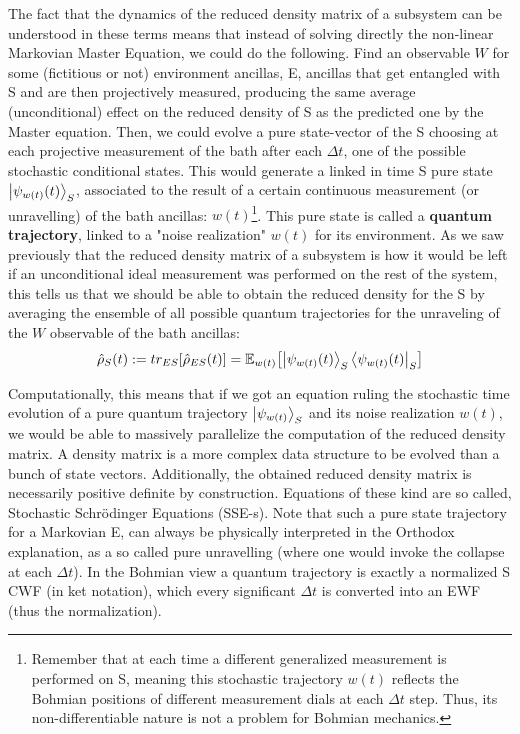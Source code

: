 \documentclass[11pt, a4paper]{article} %
\begin{document}
The fact that the dynamics of the reduced density matrix of a subsystem can be understood in these terms means that instead of solving directly the non-linear Markovian Master Equation, we could do the following. Find an observable $W$ for some (fictitious or not) environment ancillas, E, ancillas that get entangled with S and are then projectively measured, producing the same average (unconditional) effect on the reduced density of S as the predicted one by the Master equation. Then, we could evolve a pure state-vector of the S choosing at each projective measurement of the bath after each $\Delta t$, one of the possible stochastic conditional states. This would generate a linked in time S pure state $\ket{\psi_{w(t)}(t)}_S$, associated to the result of a certain continuous measurement (or unravelling) of the bath ancillas: $w(t)$\footnote{Remember that at each time a different generalized measurement is performed on S, meaning this stochastic trajectory $w(t)$ reflects the Bohmian positions of different measurement dials at each $\Delta t$ step. Thus, its non-differentiable nature is not a problem for Bohmian mechanics.}. This pure state is called a {\bf quantum trajectory}, linked to a "noise realization" $w(t)$ for its environment. As we saw previously that the reduced density matrix of a subsystem is how it would be left if an unconditional ideal measurement was performed on the rest of the system, this tells us that we should be able to obtain the reduced density for the S by averaging the ensemble of all possible quantum trajectories for the unraveling of the $W$ observable of the bath ancillas:
\begin{equation}
\hat{\rho}_S(t):=tr_{ES}[\hat{\rho}_{ES}(t)]=\mathbb{E}_{w(t)}\qty[\ket{\psi_{w(t)}(t)}_S\bra{\psi_{w(t)}(t)}_S]
\end{equation}

Computationally, this means that if we got an equation ruling the stochastic time evolution of a pure quantum trajectory $\ket{\psi_{w(t)}}_S$ and its noise realization $w(t)$, we would be able to massively parallelize the computation of the reduced density matrix. A density matrix is a more complex data structure to be evolved than a bunch of state vectors. Additionally, the obtained reduced density matrix is necessarily positive definite by construction. Equations of these kind are so called, Stochastic Schrödinger Equations (SSE-s). Note that such a pure state trajectory for a Markovian E, can always be physically interpreted in the Orthodox explanation, as a so called pure unravelling (where one would invoke the collapse at each $\Delta t$). In the Bohmian view a quantum trajectory is exactly a normalized S CWF (in ket notation), which every significant $\Delta t$ is converted into an EWF (thus the normalization).
\end{document}
